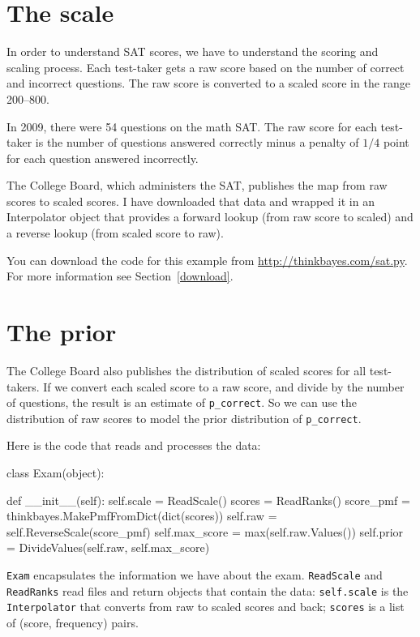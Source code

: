 \documentclass[12pt]{book}
\theoremstyle{exercise}
\newcommand{\py}[1]{{\tt #1}}%
\begin{document}
\section{The scale}

In order to understand SAT scores, we have to understand the scoring
and scaling process.  Each test-taker gets a raw score based on the
number of correct and incorrect questions.  The raw score is converted
to a scaled score in the range 200--800.

In 2009, there were 54 questions on the math SAT.  The raw score
for each test-taker is the number of questions answered correctly
minus a penalty of $1/4$ point for each question answered incorrectly.

The College Board, which administers the SAT, publishes the
map from raw scores to scaled scores.  I have downloaded that
data and wrapped it in an Interpolator object that provides a forward
lookup (from raw score to scaled) and a reverse lookup (from scaled
score to raw).

You can download the code for this example from
\url{http://thinkbayes.com/sat.py}.
  For more information
see Section~\ref{download}.

\section{The prior}

The College Board also publishes the distribution of scaled scores
for all test-takers.  If we convert each scaled score to a raw score,
and divide by the number of questions, the result is an estimate
of \verb"p_correct".
So we can use the distribution of raw scores to model the
prior distribution of \verb"p_correct".

Here is the code that reads and processes the data:

\begin{code}
class Exam(object):

    def __init__(self):
        self.scale = ReadScale()
        scores = ReadRanks()
        score_pmf = thinkbayes.MakePmfFromDict(dict(scores))
        self.raw = self.ReverseScale(score_pmf)
        self.max_score = max(self.raw.Values())
        self.prior = DivideValues(self.raw, self.max_score)
\end{code}

\py{Exam} encapsulates the information we have about the exam.
\py{ReadScale} and \py{ReadRanks} read files and return
objects that contain the data:
\py{self.scale} is the \py{Interpolator} that converts
from raw to scaled scores and back;  \py{scores} is a list
of (score, frequency) pairs.
\end{document}
